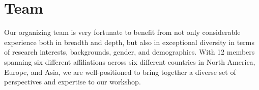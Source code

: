 \documentclass{article}
\begin{document}





% 





\section{Team}

Our organizing team is very fortunate to benefit from not only considerable experience both in breadth and depth, but also in exceptional diversity in terms of research interests, backgrounds, gender, and demographics. With 12 members spanning six different affiliations across six different countries in North America, Europe, and Asia, we are well-positioned to bring together a diverse set of perspectives and expertise to our workshop.
\end{document}

